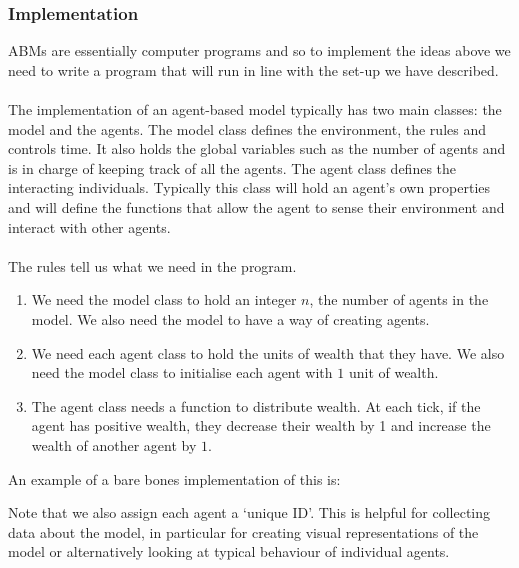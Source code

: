 \subsubsection{Implementation}
ABMs are essentially computer programs and so to implement the ideas above we need to write a program that will run in line with the set-up we have described.\\
\\
The implementation of an agent-based model typically has two main classes: the model and the agents. The model class defines the environment, the rules and controls time. It also holds the global variables such as the number of agents and is in charge of keeping track of all the agents. The agent class defines the interacting individuals. Typically this class will hold an agent's own properties and will define the functions that allow the agent to sense their environment and interact with other agents.\\
\\
The rules tell us what we need in the program.
\begin{enumerate}[
	]
	\item\label{} We need the model class to hold an integer $n$, the number of agents in the model. We also need the model to have a way of creating agents.
	\item\label{} We need each agent class to hold the units of wealth that they have. We also need the model class to initialise each agent with $1$ unit of wealth.
	\item\label{} The agent class needs a function to distribute wealth. At each tick, if the agent has positive wealth, they decrease their wealth by 1 and increase the wealth of another agent by $1$.
\end{enumerate}
An example of a bare bones implementation of this is:

Note that we also assign each agent a `unique ID'. This is helpful for collecting data about the model, in particular for creating visual representations of the model or alternatively looking at typical behaviour of individual agents.
